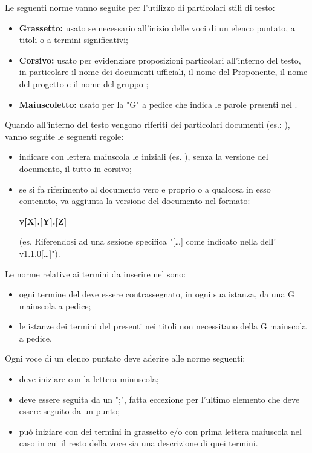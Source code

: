         Le seguenti norme vanno seguite per l'utilizzo di particolari stili di testo:
        \begin{itemize}
          \item \textbf{Grassetto:} usato se necessario all'inizio delle voci di un elenco puntato, a titoli o a termini significativi;
          \item \textbf{Corsivo:} usato per evidenziare proposizioni particolari all'interno del testo, in particolare il nome dei documenti ufficiali, il nome del Proponente, il nome del progetto \textit{\NomeProgetto} e il nome del gruppo \textit{\Gruppo{}};
          \item \textbf{Maiuscoletto:} usato per la "G" a pedice che indica le parole presenti nel \Glossario{}.
        \end{itemize}
        Quando all'interno del testo vengono riferiti dei particolari documenti (es.: \AdR), vanno seguite le seguenti regole:
        \begin{itemize}
          \item indicare con lettera maiuscola le iniziali (es. \AdR), senza la versione del documento, il tutto in corsivo;
          \item se si fa riferimento al documento vero e proprio o a qualcosa in esso contenuto, va aggiunta la versione del documento nel formato:
          \begin{center}
              \textbf{v[X].[Y].[Z]}
          \end{center}
          (es. Riferendosi ad una sezione specifica "[\dots{}] come indicato nella  dell'\AdR{} v1.1.0[\dots{}]").
        \end{itemize}
      	Le norme relative ai termini da inserire nel \Glossario{} sono:
        \begin{itemize}
          \item ogni termine del \Glossario{} deve essere contrassegnato, in ogni sua istanza, da una G maiuscola a pedice;
          \item le istanze dei termini del \Glossario{} presenti nei titoli non necessitano della G maiuscola a pedice.
        \end{itemize}

          Ogni voce di un elenco puntato deve aderire alle norme seguenti:
          \begin{itemize}
            \item deve iniziare con la lettera minuscola;
            \item deve essere seguita da un ";", fatta eccezione per l'ultimo elemento che deve essere seguito da un punto;
            \item puó iniziare con dei termini in grassetto e/o con prima lettera maiuscola nel caso in cui il resto della voce sia una descrizione di quei termini.
          \end{itemize}

